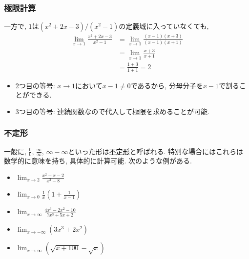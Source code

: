 

\begin{frame}
\frametitle{極限計算} 



一方で, $1$は$(x^2+2x-3)/(x^2-1)$の定義域に入っていなくても, 
\begin{align*}
\lim_{x \to 1} \frac{x^2+2x-3}{x^2-1} &= \lim_{x \to 1} \frac{(x-1)(x+3)}{(x-1)(x+1)} \\
& = \lim_{x \to 1} \frac{x+3}{x+1} \\
& =  \frac{1+3}{1+1} =2 
\end{align*}

\begin{itemize}
\item 2つ目の等号: $x \to 1$において$x-1\neq 0$であるから, 分母分子を$x-1$で割ることができる. 
\item 3つ目の等号: 連続関数なので代入して極限を求めることが可能. 
\end{itemize}


\end{frame}





\begin{frame}
\frametitle{不定形} 

一般に, $\frac{0}{0}$, $\frac{\infty}{\infty}$, $\infty - \infty$といった形は\underline{不定形}と呼ばれる. 
特別な場合にはこれらは数学的に意味を持ち, 具体的に計算可能. 
次のような例がある. 

\begin{itemize}
\item $\displaystyle \lim_{x\to 2} \frac{x^2-x-2}{x^3-8}$
\item $\displaystyle \lim_{x\to 0} \frac{1}{x}(1+\frac{1}{x-1})$
\item $\displaystyle \lim_{x \to \infty}\frac{4x^3-2x^2-10}{7x^3+5x+2}$
\item $\displaystyle \lim_{x\to -\infty} (3x^3+2x^2)$
\item $\displaystyle \lim_{x\to \infty} (\sqrt{x+100}-\sqrt{x})$
\end{itemize}


\end{frame}


